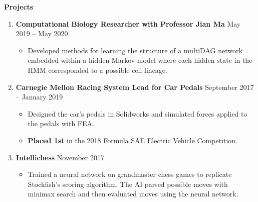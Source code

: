 \documentclass[letterpaper,11pt]{article}
\newlength{\outerbordwidth}
\newcommand{\resitem}[1]{\item #1 \vspace{-2pt}}
\newcommand{\resheading}[1]{\vspace{0pt} %
  \parbox{\textwidth}{\setlength{\FrameSep}{\outerbordwidth}
    \begin{shaded}
\setlength{\fboxsep}{0pt}\framebox[\textwidth][l]{\setlength{\fboxsep}{3.5pt}\fcolorbox{shadecolorB}{shadecolorB}{\textbf{\sffamily{\mbox{~}\makebox[7.262in][l]{\large #1} \vphantom{p\^{E}}}}}} %
    \end{shaded}
  }\vspace{-7pt} %
}
\begin{document}
\vspace{-10pt}

\begin{mybox}
	\hspace{-8pt} \textbf{Projects}
\end{mybox}


\vspace{-5pt}
\begin{enumerate}[leftmargin=10pt]
\setlength\itemsep{1em}

\item[] \textbf{Computational Biology Researcher with Professor Jian Ma} \cftdotfill{\cftdotsep} May 2019 -- May 2020\\
\vspace{-4pt}
\begin{itemize}
	\resitem{Developed methods for learning the structure of a multiDAG network embedded within a hidden Markov model where each hidden state in the HMM corresponded to a possible cell lineage.}
\end{itemize}

\vspace{-12pt}

\item[] \textbf{Carnegie Mellon Racing System Lead for Car Pedals} \cftdotfill{\cftdotsep} September 2017 -- January 2019\\
\vspace{-4pt}
\begin{itemize}
	\resitem{Designed the car’s pedals in Solidworks and simulated forces applied to the pedals with FEA.}
	\resitem{\textbf{\textcolor{myGreen}{Placed 1st}} in the 2018 Formula SAE Electric Vehicle Competition.}
\end{itemize}

\vspace{-12pt}

\item[] \textbf{Intellichess} \cftdotfill{\cftdotsep} November 2017\\
\vspace{-4pt}
\begin{itemize}
	\resitem{Trained a neural network on grandmaster chess games to replicate Stockfish's scoring algorithm. 
	The AI parsed possible moves with minimax search and then evaluated moves using the neural network.}
\end{itemize}

\end{enumerate}
\end{document}
